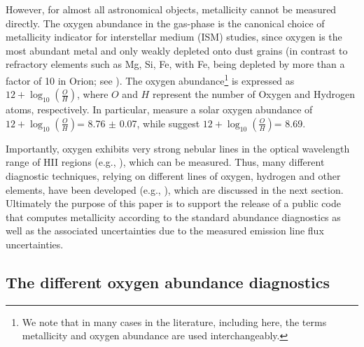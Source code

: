 \documentclass{emulateapj}
\newcommand{\oxab}{\ensuremath{12 + \log_{10}(\frac{O}{H})}}
\begin{document}
However, for almost all astronomical objects, metallicity cannot be measured directly. The oxygen abundance in the gas-phase is the canonical choice of metallicity indicator for interstellar medium (ISM) studies, since oxygen is the most abundant metal and only weakly depleted onto dust grains (in contrast to refractory elements such as Mg, Si, Fe, with Fe, being depleted by more than a factor of 10 in Orion; see \citealt{simondiaz11-orion}). The oxygen abundance\footnote{We note that in many cases in the literature, including here, the terms metallicity and oxygen abundance are used interchangeably.} is expressed as  \oxab, where $O$ and $H$ represent the number of Oxygen and Hydrogen atoms, respectively. In particular, \citealt{chaffau11} measure a solar oxygen abundance of \oxab = 8.76 $\pm$ 0.07, while \citet{asplund09_rev} suggest \oxab = 8.69.

Importantly, oxygen exhibits very strong nebular lines in the optical wavelength range of HII regions (e.g., \citealt{pagel79,osterbrock89,tremonti04}), which can be measured. Thus, many different diagnostic techniques, relying on different lines of oxygen, hydrogen and other elements, have been developed (e.g., \citealt{kewley02,pettini04,kobulnicky04,kewley08}), which are discussed in the next section. Ultimately the  purpose of this paper is to support the release of a public code that computes metallicity according to the standard abundance diagnostics as well as the associated uncertainties due to the measured emission line flux uncertainties.



\subsection{The different oxygen abundance diagnostics}
\end{document}

